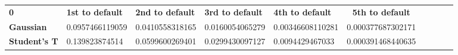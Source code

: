 \begin{center}
 \begin{tabular}{|l|l|l|l|l|c|c|c|c|c|}
\hline
\textbf{0} & \textbf{1st to default} & \textbf{2nd to default} & \textbf{3rd to default} & \textbf{4th to default} & \textbf{5th to default}\\\hhline{|=|=|=|=|=|=|}
\textbf{Gaussian} & 0.0957466119059 & 0.0410558318165 & 0.0160054065279 & 0.00346608110281 & 0.000377687302171\\
\textbf{Student's T} & 0.139823874514 & 0.0599600269401 & 0.0299430097127 & 0.0094429467033 & 0.000391468440635\\
\hline
\end{tabular}
\end{center}